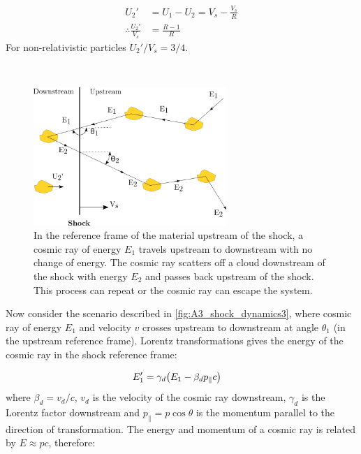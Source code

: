\begin{equation}
    \begin{aligned}
        U_2'&=U_1-U_2 =V_s- \frac{V_s}{R} \\
        \therefore \frac{U_2'}{V_s}&=\frac{R-1}{R}
    \end{aligned} \label{eq:down_upstream_v_ratio}
\end{equation}
\noindent For non-relativistic particles ${U_2'}/{V_s}=3/4$.
\par~\par 
\begin{figure}
	\centering
	\includegraphics[width=0.65\textwidth]{A3_Diffusive_Shock_Acceleration/Images/dsa.png}
	\caption{In the reference frame of the material upstream of the shock, a cosmic ray of energy $E_1$ travels upstream to downstream with no change of energy. The cosmic ray scatters off a cloud downstream of the shock with energy $E_2$ and passes back upstream of the shock. This process can repeat or the cosmic ray can escape the system.}
	\label{fig:A3_shock_dynamics3}
\end{figure}

Now consider the scenario described in \autoref{fig:A3_shock_dynamics3}, where cosmic ray of energy $E_1$ and velocity $v$ crosses upstream to downstream at angle $\theta_1$ (in the upstream reference frame). Lorentz transformations gives the energy of the cosmic ray in the shock reference frame:

\begin{equation}
    \begin{aligned}
        E_1'&=\gamma_d\qty(E_1-\beta_d p_\parallel c)
    \end{aligned}
\end{equation}
\noindent where $\beta_d=v_d/c$, $v_d$ is the velocity of the cosmic ray downstream, $\gamma_d$ is the Lorentz factor downstream and $p_\parallel=p\cos\theta$ is the momentum parallel to the direction of transformation. The energy and momentum of a cosmic ray is related by $E\approx pc$, therefore:

